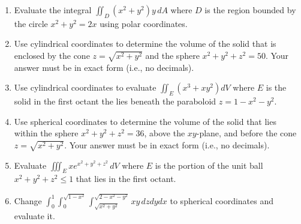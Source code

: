 \documentclass[letterpaper,12pt,fleqn]{article}
\begin{document}
\begin{enumerate}
\item Evaluate the integral \(\displaystyle\iint_D(x^2+y^2)y\,dA\) where \(D\) is the region bounded by the
  circle \(x^2+y^2=2x\) using polar coordinates.

\item Use cylindrical coordinates to determine the volume of the solid that is enclosed by the cone
  \(z=\sqrt{x^2+y^2}\) and the sphere \(x^2+y^2+z^2=50\).  Your answer must be in exact form (i.e., no decimals).

\item Use cylindrical coordinates to evaluate \(\displaystyle\iint_E(x^3+xy^2)dV\) where \(E\) is the solid in the
  first octant the lies beneath the paraboloid \(z=1-x^2-y^2\).

\item Use spherical coordinates to determine the volume of the solid that lies within the sphere \(x^2+y^2+z^2=36\),
  above the \(xy\)-plane, and before the cone \(z=\sqrt{x^2+y^2}\).  Your answer must be in exact form (i.e., no
  decimals).

\item Evaluate \(\displaystyle\iiint_Exe^{x^2+y^2+z^2}\,dV\) where \(E\) is the portion of the unit ball
  \(x^2+y^2+z^2\le1\) that lies in the first octant.

\item Change \(\displaystyle\int_0^1\int_0^{\sqrt{1-x^2}}\int_{\sqrt{x^2+y^2}}^{\sqrt{2-x^2-y^2}}xy\,dzdydx\) to spherical
  coordinates and evaluate it.
\end{enumerate}
\end{document}

